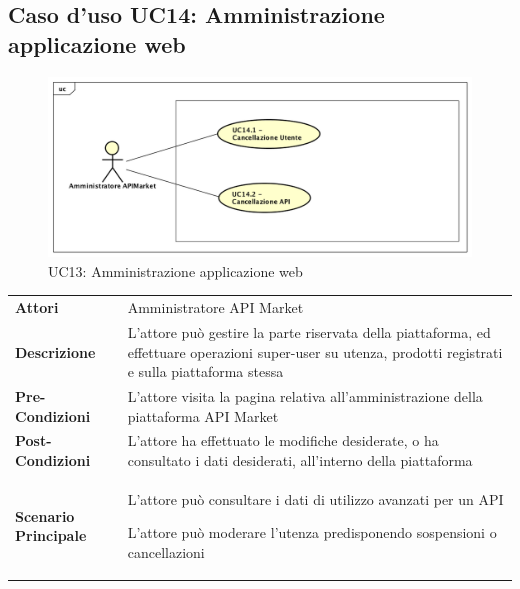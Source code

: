 \newpage
\subsection{Caso d'uso UC14: Amministrazione applicazione web}
\label{UC14}
\begin{figure}[ht]
	\centering
	\includegraphics[scale=0.45]{UML/UC14.png}
	\caption{UC13: Amministrazione applicazione web}
\end{figure}

\renewcommand*{\arraystretch}{1.6}
\begin{longtable}{ l | p{11cm}}
	\hline
	\rowcolor{Gray}
	\multicolumn{2}{c}{UC14: Amministrazione applicazione web} \\
	\hline
	\textbf{Attori} & Amministratore API Market \\
	\textbf{Descrizione} & L'attore può gestire la parte riservata della piattaforma, ed effettuare operazioni super-user su utenza, prodotti registrati e sulla piattaforma stessa \\
	\textbf{Pre-Condizioni} & L'attore visita la pagina relativa all'amministrazione della piattaforma API Market\\
	\textbf{Post-Condizioni}& L'attore ha effettuato le modifiche desiderate, o ha consultato i dati desiderati, all'interno della piattaforma\\
	\textbf{Scenario Principale} & \begin{enumerate*}[label=(\arabic*.),itemjoin={\newline}]
		\item L'attore può consultare i dati di utilizzo avanzati per un API
		\item L'attore può moderare l'utenza predisponendo sospensioni o cancellazioni
	\end{enumerate*}\\
\end{longtable}


